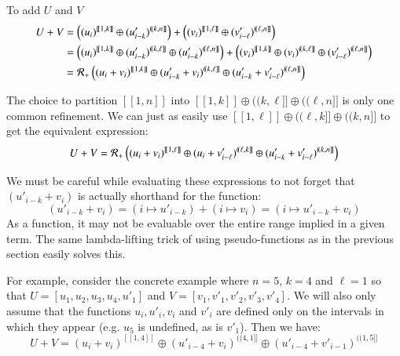 To add $U$ and $V$
\begin{align}
	U + V
	&= \left( (u_i)^{[\![1, k]\!]} \oplus (u'_{i-k})^{(\!(k,n]\!]} \right) 
		+
		\left( (v_i)^{[\![1, \ell]\!]} \oplus (v'_{i-\ell})^{(\!(\ell,n]\!]} \right) \\
	&= \left( (u_i)^{[\![1, k]\!]} \oplus (u'_{i-k})^{(\!(k,\ell]\!]} \oplus (u'_{i-k})^{(\!(\ell,n]\!]} \right) 
		+
		\left( (v_i)^{[\![1, k]\!]} \oplus (v_i)^{(\!(k, \ell]\!]} \oplus (v'_{i-\ell})^{(\!(\ell,n]\!]} \right) \\
	&= \R[+] \left( (u_i + v_i)^{[\![1, k]\!]} 
		\oplus (u'_{i-k} + v_i)^{(\!(k,\ell]\!]} 
		\oplus (u'_{i-k}+v'_{i-\ell})^{(\!(\ell,n]\!]} \right)
\end{align}


The choice to partition $[\![1,n]\!]$ into $[\![1,k]\!] \oplus (\!(k,\ell]\!] \oplus (\!(\ell, n]\!]$ is only one common refinement.
We can just as easily use $[\![1,\ell]\!] \oplus (\!(\ell, k]\!] \oplus (\!(k, n]\!]$ to get the equivalent expression:
\begin{equation}
	U + V = \R[+] \left( (u_i + v_i)^{[\![1, \ell]\!]} 
		\oplus (u_{i} + v'_{i-\ell})^{(\!(\ell,k]\!]} 
		\oplus (u'_{i-k}+v'_{i-\ell})^{(\!(k,n]\!]} \right)
\end{equation}


We must be careful while evaluating these expressions to not forget that $(u'_{i-k} + v_i)$ 
is actually shorthand for the function:
\begin{equation*}
	(u'_{i-k} + v_i) = (i \mapsto u'_{i-k}) + (i \mapsto v_i) = (i \mapsto u'_{i-k} + v_i)
\end{equation*}
As a function, it may not be evaluable over the entire range implied in a given term.
The same lambda-lifting trick of using pseudo-functions as in the previous section easily solves this.


For example, consider the concrete example where $n=5$, $k=4$ and $\ell = 1$ so that
$U = [ u_1, u_2, u_3, u_4, u'_1 ]$ and
$V = [ v_1, v'_1, v'_2, v'_3, v'_4 ]$.
We will also only assume that the functions $u_i, u'_i, v_i$ and $v'_i$ are defined only on the intervals in which they appear (e.g. $u_5$ is undefined, as is $v'_1$).
Then we have:
\begin{equation*}
	U + V = (u_i + v_i)^{[\![1,4]\!]} \oplus (u'_{i-4} + v_i)^{(\!(4,1]\!]} \oplus (u'_{i-4} + v'_{i-1})^{(\!(1,5]\!]}
\end{equation*}

